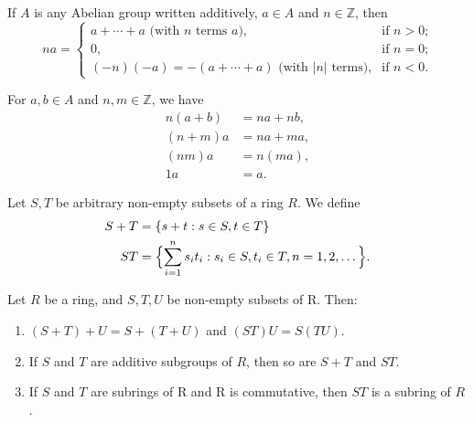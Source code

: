 \begin{Def}
  If $A$ is any Abelian group written additively, $a \in A$ and $n \in
  \mathbb{Z}$, then
  \[
    na = 
    \begin{cases}
      a + \cdots + a \text{ (with $n$ terms $a$),} &\text{if $n > 0$;}\\
      0, &\text{if $n = 0$;}\\
      (-n)(-a) = -(a + \cdots + a) \text{ (with $|n|$ terms),} &\text{if $n < 0$.}
    \end{cases}
  \]

  For $a, b \in A$ and $n, m \in \mathbb{Z}$, we have
  \begin{align*}
    n(a+b) &= na + nb,\\
    (n+m)a &= na + ma,\\
    (nm)a &= n(ma),\\
    1a &= a.
  \end{align*}
\end{Def}

\begin{Def}
  Let $S, T$ be arbitrary non-empty subsets of a ring $R$. We define
  \begin{align*}
    S + T &= \{ s+t: s \in S, t \in T \}\\
    ST &= \Bigl\{\sum^{n}_{i = 1} s_i t_i : s_i \in S, t_i \in T, n = 1, 2, \dots \Bigr\} .
  \end{align*}

\end{Def}

\begin{Lemma}
  Let $R$ be a ring, and $S, T, U$ be non-empty subsets of R. Then:
  \begin{enumerate}[label=(\roman*)]
    \item $(S + T) + U = S + (T + U)$ and $(ST)U = S(TU)$.
    \item If $S$ and $T$ are additive subgroups of $R$, then so are $S+T$ and
      $ST$.
    \item If $S$ and $T$ are subrings of R and R is commutative, then $ST$ is a
      subring of $R$.
  \end{enumerate}
\end{Lemma}

